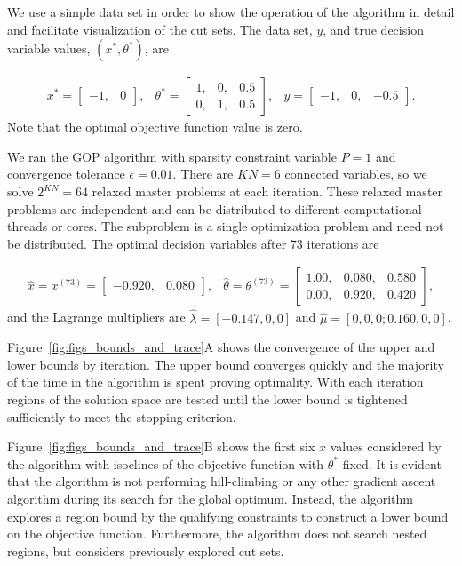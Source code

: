 \documentclass{article} %
\begin{document}
We use a simple data set in order to show the
operation of the algorithm in detail and facilitate visualization of the cut sets. The data set, $y$, and true
decision variable values, $(x^*, \theta^*)$, are

\begin{eqnarray*}
	x^* =
	\left[ 
	\begin{array}{cc} 
		-1, & 0
	\end{array} 
	\right],
	&
	\theta^* = 
	\left[ 
	\begin{array}{ccc} 
		1, & 0, & 0.5 \\
		0, & 1, & 0.5
	\end{array} 
	\right],
	&
	y = 
	\left[ 
	\begin{array}{ccc} 
		-1, & 0, & -0.5
	\end{array} 
	\right].
\end{eqnarray*}
Note that the optimal objective function value is zero.

We ran the GOP algorithm with sparsity constraint variable $P=1$ and
convergence tolerance $\epsilon = 0.01$. There are $KN = 6$ connected
variables, so we solve $2^{KN} = 64$ relaxed master problems at each iteration.
These relaxed master problems are independent and can be distributed to
different computational threads or cores. The subproblem is a single
optimization problem and need not be distributed. The optimal decision
variables after 73 iterations are

\begin{eqnarray*}
	\hat{x} = x^{(73)} =
	\left[ 
	\begin{array}{cc} 
		-0.920, & 0.080
	\end{array} 
	\right],
	&
	\hat{\theta} = \theta^{(73)} =
	\left[ 
	\begin{array}{ccc} 
		1.00, & 0.080, & 0.580 \\
		0.00, & 0.920, & 0.420
	\end{array} 
	\right],
\end{eqnarray*}
and the Lagrange multipliers are $\hat{\lambda} = [-0.147, 0, 0]$ and $\hat{\mu} = [0, 0, 0; 0.160, 0, 0]$.

Figure~\ref{fig:figs_bounds_and_trace}A shows the convergence of the upper and
lower bounds by iteration. The upper bound converges quickly and the majority
of the time in the algorithm is spent proving optimality. With each iteration
regions of the solution space are tested until the lower bound is tightened
sufficiently to meet the stopping criterion.

Figure~\ref{fig:figs_bounds_and_trace}B shows the first six $x$ values
considered by the algorithm with isoclines of the objective function with
$\theta^*$ fixed. It is evident that the algorithm is not performing
hill-climbing or any other gradient ascent algorithm during its search for the
global optimum. Instead, the algorithm explores a region bound by the
qualifying constraints to construct a lower bound on the objective function.
Furthermore, the algorithm does not search nested regions, but considers
previously explored cut sets.
\end{document}
